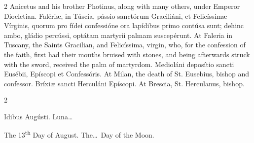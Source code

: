 \begin{paracol}{2}
 Anicetus and his brother Photinus, along with many others, under Emperor 
 Diocletian.
\switchcolumn*
{}
Falériæ, in Túscia, 
 pássio sanctórum Graciliáni, et Felicíssimæ Vírginis, quorum pro fídei 
 confessióne ora lapídibus primo contúsa sunt; dehinc ambo, gládio percússi, 
 optátam martyrii palmam suscepérunt.
\switchcolumn
{}
At Faleria in Tuscany, the Saints 
 Gracilian, and Felicíssima, virgin, who, for the confession of the faith, 
 first had their mouths bruised with stones, and being afterwards struck with 
 the sword, received the palm of martyrdom.
\switchcolumn*
{}
Medioláni deposítio 
 sancti Eusébii, Epíscopi et Confessóris.
\switchcolumn
{}
At Milan, the death of St. Eusebius, bishop and 
 confessor.
\switchcolumn*
{}
Bríxiæ sancti Herculáni 
 Epíscopi.
\switchcolumn
{}
At Brescia, St. Herculanus, bishop.
\switchcolumn*
{}
\end{paracol}


\begin{paracol}{2}
\begin{center}{\color{gregoriocolor} Idibus Augústi. 
 Luna\dots\ }\end{center}
\switchcolumn
{}
\begin{center}{\color{gregoriocolor} The 13\textsuperscript{th} Day of 
 August. The\dots\ Day of the Moon.}\end{center}
\end{paracol}

